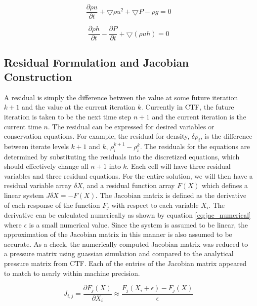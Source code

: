 \documentclass{mc2015}
\begin{document}
    \begin{equation}
    	\label{eq:pde_momentum}
    	\frac{ \partial \rho u}{\partial t} + \bigtriangledown \rho u^{2} +
    	\bigtriangledown P - \rho g  = 0
    \end{equation}
    
    \begin{equation}
    	\label{eq:pde_energy}
    	\frac{ \partial \rho h}{\partial t} -
    	\frac{ \partial  P}{\partial t} + 
    	\bigtriangledown ( \rho  u h )
    	= 0
    \end{equation}

\subsection{Residual Formulation and Jacobian Construction}

	A residual is simply the difference between the value at some future iteration
    $k+1$ and the value at the current iteration $k$. Currently in CTF, the
    future iteration is taken to be the next time step $n+1$ and the
    current iteration is the current time $n$. The residual can be expressed for
    desired variables or conservation equations. For example, the residual for
    density, $\delta \rho_{i}$, is the difference between iterate levels $k+1$
    and $k$, $\rho^{k+1}_{i} - \rho^{k}_{i}$. The residuals for the equations
    are determined by substituting the residuals into the discretized equations,
    which should effectively change all $n+1$ into $k$. Each cell will have
    three residual variables and three residual equations. For the entire
    solution, we will then have a residual variable array $\delta X$, and a
    residual function array $F(X)$ which defines a linear system $J \delta X = -
    F(X)$. The Jacobian matrix is defined as the derivative of each response of
    the function $F_{j}$ with respect to each variable $X_{i}$.
    The derivative can be calculated numerically as shown by equation
    \eqref{eq:jac_numerical} where $\epsilon$ is a small numerical value.
    Since the system is assumed to be linear, the approximation of the Jacobian
    matrix in this manner is also assumed to be accurate. As a check, the
    numerically computed Jacobian matrix was reduced to a pressure matrix using
    guassian simulation and compared to the analytical pressure matrix from CTF.
    Each of the entries of the Jacobian matrix appeared to match to nearly
    within machine precision.
    
    \begin{equation}
    	\label{eq:jac_numerical}
    	J_{i,j}=\frac{ \partial F_{j}(X)}{\partial X_{i}}
    	      \approx \frac{F_{j}(X_{i}+\epsilon)-F_{j}(X)}{\epsilon}
    \end{equation}
    
\end{document}

